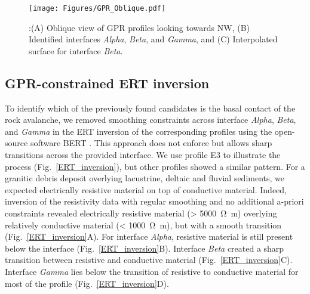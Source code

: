 \documentclass[utf8]{frontiersSCNS}
\begin{document}
								 \begin{figure}

	\texttt{[image: Figures/GPR\_Oblique.pdf]}
		\caption{:(A) Oblique view of GPR profiles looking towards NW, (B) Identified interfaces \emph{Alpha}, \emph{Beta}, and \emph{Gamma}, and (C) Interpolated surface for interface \emph{Beta}. \label{GPR_Oblique}}

								   \end{figure}

							   
			   

								   
\subsection{GPR-constrained ERT inversion}

To identify which of the previously found candidates is the basal contact of the rock avalanche, we removed smoothing constraints across interface \emph{Alpha}, \emph{Beta}, and \emph{Gamma} in the ERT inversion of the corresponding profiles \citep{doetsch2012constraining} using the open-source software BERT \cite[][]{gunther2006three,Ruecker2017}. This  approach does not enforce but allows sharp transitions across the provided interface. We use profile E3 to illustrate the process (Fig.~\ref{ERT_inversion}), but other profiles showed a similar pattern. For a granitic debris deposit overlying lacustrine, deltaic and fluvial sediments, we expected electrically resistive material on top of conductive material. Indeed, inversion of the resistivity data with regular smoothing and no additional a-priori constraints revealed electrically resistive material (\SI{> 5000}{\ohm m}) overlying relatively conductive material (\SI{< 1000}{\ohm m}), but with a smooth transition (Fig.~\ref{ERT_inversion}A). For interface \emph{Alpha}, resistive material is still present below the interface (Fig.~\ref{ERT_inversion}B). Interface \emph{Beta} created a sharp transition between resistive and conductive material (Fig.~\ref{ERT_inversion}C). Interface \emph{Gamma} lies below the transition of resistive to conductive material for most of the profile (Fig.~\ref{ERT_inversion}D). 
\end{document}
